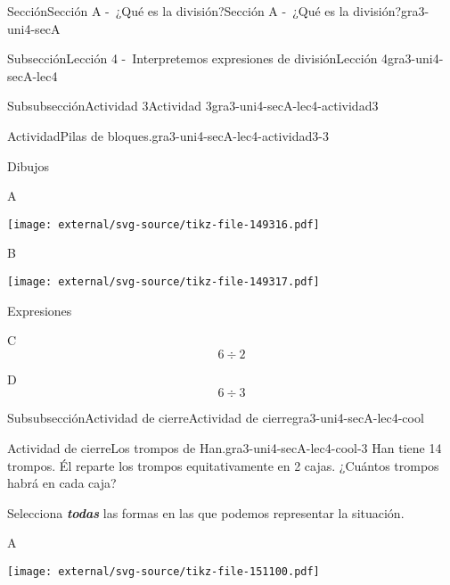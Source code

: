 \documentclass[twoside,10pt,]{article}
\newcommand{\alert}[1]{\textbf{\textit{#1}}}
\begin{document}
\begin{sectionptx}{Sección}{Sección A -~¿Qué es la división?}{}{Sección A -~¿Qué es la división?}{}{}{gra3-uni4-secA}
\begin{subsectionptx}{Subsección}{Lección 4 -~Interpretemos expresiones de división}{}{Lección 4}{}{}{gra3-uni4-secA-lec4}
\begin{subsubsectionptx}{Subsubsección}{Actividad 3}{}{Actividad 3}{}{}{gra3-uni4-secA-lec4-actividad3}
\begin{activity}{Actividad}{Pilas de bloques.}{gra3-uni4-secA-lec4-actividad3-3}
\begin{enumerate}
\end{enumerate}
Dibujos%
\begin{sidebyside}{2}{0.05}{0.05}{0.1}%
\begin{sbspanel}{0.4}%
A%
\par
\texttt{[image: external/svg-source/tikz-file-149316.pdf]}
\end{sbspanel}%
\begin{sbspanel}{0.4}%
B%
\par
\texttt{[image: external/svg-source/tikz-file-149317.pdf]}
\end{sbspanel}%
\end{sidebyside}%
\par
Expresiones%
\begin{sidebyside}{2}{0.05}{0.05}{0.1}%
\begin{sbspanel}{0.4}%
C%
\begin{equation*}
6\div 2
\end{equation*}
%
\end{sbspanel}%
\begin{sbspanel}{0.4}%
\par
D%
\begin{equation*}
6\div 3
\end{equation*}
%
\end{sbspanel}%
\end{sidebyside}%
\end{activity}%
\end{subsubsectionptx}
%
%
\typeout{************************************************}
\typeout{************************************************}
%
\begin{subsubsectionptx}{Subsubsección}{Actividad de cierre}{}{Actividad de cierre}{}{}{gra3-uni4-secA-lec4-cool}
\begin{project}{Actividad de cierre}{Los trompos de Han.}{gra3-uni4-secA-lec4-cool-3}%
Han tiene 14 trompos. Él reparte los trompos equitativamente en 2 cajas. ¿Cuántos trompos habrá en cada caja?%
\par
Selecciona \alert{todas} las formas en las que podemos representar la situación.%
\begin{sidebyside}{4}{0.0075}{0.0075}{0.015}%
\begin{sbspanel}{0.02}%
A%
\end{sbspanel}%
\begin{sbspanel}{0.45}%
\texttt{[image: external/svg-source/tikz-file-151100.pdf]}
\end{sbspanel}%

\end{sidebyside}
\end{project}
\end{subsubsectionptx}
\end{subsectionptx}
\end{sectionptx}
\end{document}
